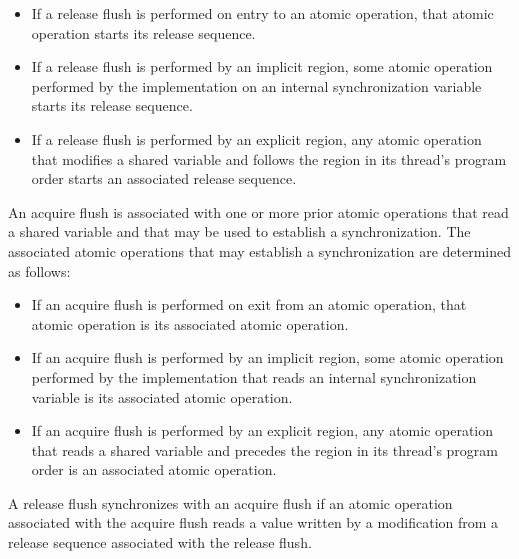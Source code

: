 \begin{itemize}
\item If a release flush is performed on entry to an atomic operation, that
    atomic operation starts its release sequence.
\item If a release flush is performed by an implicit  region, some
    atomic operation performed by the implementation on an internal
    synchronization variable starts its release sequence.
\item If a release flush is performed by an explicit  region, any
    atomic operation that modifies a shared variable and follows the
     region in its thread's program order starts an associated
    release sequence.
\end{itemize}

An acquire flush is associated with one or more prior atomic operations that
read a shared variable and that may be used to establish a synchronization.
The associated atomic operations that may establish a synchronization are
determined as follows:

\begin{itemize}
\item If an acquire flush is performed on exit from an atomic operation, that
    atomic operation is its associated atomic operation.
\item If an acquire flush is performed by an implicit  region, some
    atomic operation performed by the implementation that reads an internal
    synchronization variable is its associated atomic operation.
\item If an acquire flush is performed by an explicit  region, any
    atomic operation that reads a shared variable and precedes the
     region in its thread's program order is an associated atomic
    operation.
\end{itemize}

A release flush synchronizes with an acquire flush if an atomic operation
associated with the acquire flush reads a value written by a modification from
a release sequence associated with the release flush.


